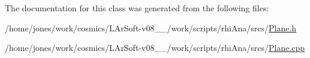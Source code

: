 The documentation for this class was generated from the following files\-:\begin{DoxyCompactItemize}
\item 
/home/jones/work/cosmics/\-L\-Ar\-Soft-\/v08\-\_\-\_/work/scripts/rhi\-Ana/srcs/\hyperlink{Plane_8h}{Plane.\-h}\item 
/home/jones/work/cosmics/\-L\-Ar\-Soft-\/v08\-\_\-\_/work/scripts/rhi\-Ana/srcs/\hyperlink{Plane_8cpp}{Plane.\-cpp}\end{DoxyCompactItemize}
